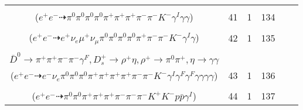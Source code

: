 \documentclass[landscape]{article}
\newcounter{rownumbers}
\newcommand\rn{\stepcounter{rownumbers}\arabic{rownumbers}}
\newcommand{\EOLP}{\\ \hline} %
\newcommand{\topoTags}[1]{#1} %
\begin{document}
\begin{longtable}{clcccc}
\rn & \makecell[l]{ $ 
e^{+} e^{-} \rightarrow \pi^{0} \pi^{+} \pi^{-} D^{*0} \bar{D}_{2}^{*0} \gamma^{I} ,
D^{*0} \rightarrow \pi^{0} D^{0} ,
\bar{D}_{2}^{*0} \rightarrow \pi^{+} D^{-} ,
D^{0} \rightarrow \pi^{0} \pi^{+} K^{-} ,
D^{-} \rightarrow \pi^{0} \pi^{-} \eta ,
\eta \rightarrow \gamma \gamma 
$ \\ ($
e^{+} e^{-} \dashrightarrow \pi^{0} \pi^{0} \pi^{0} \pi^{0} \pi^{+} \pi^{+} \pi^{+} \pi^{-} \pi^{-} K^{-} \gamma^{I} \gamma \gamma 
$) } & \topoTags{41 & }1 & 134 \EOLP

\rn & \makecell[l]{ $ 
e^{+} e^{-} \rightarrow \pi^{0} \pi^{0} \pi^{-} D^{+} \bar{D}^{*0} \gamma^{I} ,
D^{+} \rightarrow \mu^{+} \nu_{\mu} \bar{K}^{*} ,
\bar{D}^{*0} \rightarrow \bar{D}^{0} \gamma ,
\bar{K}^{*} \rightarrow \pi^{+} K^{-} ,
\bar{D}^{0} \rightarrow \pi^{0} \pi^{0} K_{L}^{0} ,
K_{L}^{0} \rightarrow e^{+} \nu_{e} \pi^{-} 
$ \\ ($
e^{+} e^{-} \dashrightarrow e^{+} \nu_{e} \mu^{+} \nu_{\mu} \pi^{0} \pi^{0} \pi^{0} \pi^{0} \pi^{+} \pi^{-} \pi^{-} K^{-} \gamma^{I} \gamma 
$) } & \topoTags{42 & }1 & 135 \EOLP

\rn & \makecell[l]{ $ 
e^{+} e^{-} \rightarrow K^{-} \phi \bar{D}^{*0} D_{s}^{*+} \gamma^{I} ,
\phi \rightarrow K_{L}^{0} K_{S}^{0} ,
\bar{D}^{*0} \rightarrow \bar{D}^{0} \gamma ,
D_{s}^{*+} \rightarrow D_{s}^{+} \gamma ,
K_{L}^{0} \rightarrow e^{-} \nu_{e} \pi^{+} \gamma^{F} ,
K_{S}^{0} \rightarrow \pi^{0} \pi^{0} ,
$ \\ $
\bar{D}^{0} \rightarrow \pi^{+} \pi^{+} \pi^{-} \pi^{-} \gamma^{F} ,
D_{s}^{+} \rightarrow \rho^{+} \eta ,
\rho^{+} \rightarrow \pi^{0} \pi^{+} ,
\eta \rightarrow \gamma \gamma 
$ \\ ($
e^{+} e^{-} \dashrightarrow e^{-} \nu_{e} \pi^{0} \pi^{0} \pi^{0} \pi^{+} \pi^{+} \pi^{+} \pi^{+} \pi^{-} \pi^{-} K^{-} \gamma^{I} \gamma^{F} \gamma^{F} \gamma \gamma \gamma \gamma 
$) } & \topoTags{43 & }1 & 136 \EOLP

\rn & \makecell[l]{ $ 
e^{+} e^{-} \rightarrow \pi^{+} D^{*-} D^{*0} p \bar{p} \gamma^{I} ,
D^{*-} \rightarrow \pi^{-} \bar{D}^{0} ,
D^{*0} \rightarrow \pi^{0} D^{0} ,
\bar{D}^{0} \rightarrow \rho^{0} \pi^{-} K^{+} ,
D^{0} \rightarrow \pi^{0} \pi^{+} K^{-} ,
\rho^{0} \rightarrow \pi^{+} \pi^{-} 
$ \\ ($
e^{+} e^{-} \dashrightarrow \pi^{0} \pi^{0} \pi^{+} \pi^{+} \pi^{+} \pi^{-} \pi^{-} \pi^{-} K^{+} K^{-} p \bar{p} \gamma^{I} 
$) } & \topoTags{44 & }1 & 137 \EOLP


\end{longtable}
\end{document}
